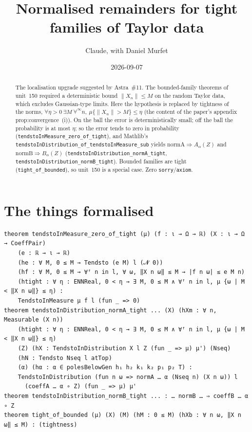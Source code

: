 \documentclass[11pt]{article}
\title{Normalised remainders for tight families of Taylor data}
\author{Claude, with Daniel Murfet}
\date{2026-09-07}
\begin{document}
\maketitle
\sloppy

\begin{abstract}
The localisation upgrade suggested by Astra~\#11. The bounded-family theorems of unit~150 required a
deterministic bound $\|X_n\|\le M$ on the random Taylor data, which excludes Gaussian-type limits.
Here the hypothesis is replaced by tightness of the norms,
$\forall\eta>0\ \exists M\ \forall^\infty n,\ \mu\{\|X_n\|>M\}\le\eta$ (the content of the paper's
appendix prop:convergence~(i)). On the ball the error is deterministically small; off the ball the
probability is at most $\eta$; so the error tends to zero in probability
(\texttt{tendstoInMeasure\_zero\_of\_tight}), and Mathlib's
\texttt{tendstoInDistribution\_of\_tendstoInMeasure\_sub} yields
$\mathrm{normA}\Rightarrow A_\alpha(Z)$ and $\mathrm{normB}\Rightarrow B_\alpha(Z)$
(\texttt{tendstoInDistribution\_normA\_tight}, \texttt{tendstoInDistribution\_normB\_tight}).
Bounded families are tight (\texttt{tight\_of\_bounded}), so unit~150 is a special case. Zero
\texttt{sorry}/\texttt{axiom}.
\end{abstract}

\section{The things formalised}
{\small
\begin{verbatim}
theorem tendstoInMeasure_zero_of_tight (μ) (f : ι → Ω → ℝ) (X : ι → Ω → CoeffPair)
    (e : ℝ → ι → ℝ)
    (he : ∀ M, 0 ≤ M → Tendsto (e M) l (𝓝 0))
    (hf : ∀ M, 0 ≤ M → ∀ᶠ n in l, ∀ ω, ‖X n ω‖ ≤ M → |f n ω| ≤ e M n)
    (htight : ∀ η : ENNReal, 0 < η → ∃ M, 0 ≤ M ∧ ∀ᶠ n in l, μ {ω | M < ‖X n ω‖} ≤ η) :
    TendstoInMeasure μ f l (fun _ => 0)
theorem tendstoInDistribution_normA_tight ... (X) (hXm : ∀ n, Measurable (X n))
    (htight : ∀ η : ENNReal, 0 < η → ∃ M, 0 ≤ M ∧ ∀ᶠ n in l, μ {ω | M < ‖X n ω‖} ≤ η)
    (Z) (hX : TendstoInDistribution X l Z (fun _ => μ) μ') (Nseq)
    (hN : Tendsto Nseq l atTop)
    (α) (hα : α ∈ polesBelowGen h₁ h₂ k₁ k₂ p₁ p₂ T) :
    TendstoInDistribution (fun n ω => normA … α (Nseq n) (X n ω)) l
      (coeffA … α ∘ Z) (fun _ => μ) μ'
theorem tendstoInDistribution_normB_tight ... : … normB … ⇒ coeffB … α ∘ Z
theorem tight_of_bounded (μ) (X) (M) (hM : 0 ≤ M) (hXb : ∀ n ω, ‖X n ω‖ ≤ M) : (tightness)
\end{verbatim}
}
\end{document}
